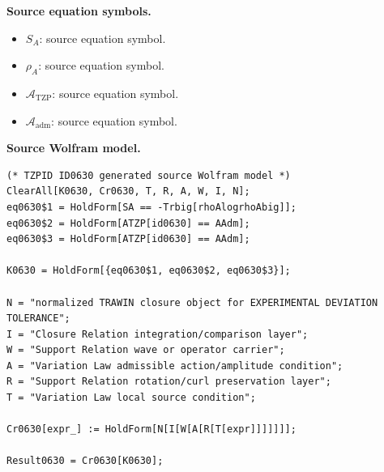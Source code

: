 \begin{minipage}[t]{0.49\linewidth}
\begingroup
\small
\raggedright
\textbf{Source equation symbols.}\par
\begin{itemize}[leftmargin=1.35em,itemsep=1pt,topsep=1pt,parsep=0pt]
    \item $S_A$: source equation symbol.
    \item $\rho_A$: source equation symbol.
    \item $\mathcal{A}_{\mathrm{TZP}}$: source equation symbol.
    \item $\mathcal{A}_{\mathrm{adm}}$: source equation symbol.
\end{itemize}
\endgroup
\end{minipage}\hfill
\begin{minipage}[t]{0.47\linewidth}
\begingroup
\scriptsize
\raggedright
\textbf{Source Wolfram model.}\par
\begin{Verbatim}[fontsize=\tiny,breaklines=true,breakanywhere=true]
(* TZPID ID0630 generated source Wolfram model *)
ClearAll[K0630, Cr0630, T, R, A, W, I, N];
eq0630$1 = HoldForm[SA == -Trbig[rhoAlogrhoAbig]];
eq0630$2 = HoldForm[ATZP[id0630] == AAdm];
eq0630$3 = HoldForm[ATZP[id0630] == AAdm];

K0630 = HoldForm[{eq0630$1, eq0630$2, eq0630$3}];

N = "normalized TRAWIN closure object for EXPERIMENTAL DEVIATION TOLERANCE";
I = "Closure Relation integration/comparison layer";
W = "Support Relation wave or operator carrier";
A = "Variation Law admissible action/amplitude condition";
R = "Support Relation rotation/curl preservation layer";
T = "Variation Law local source condition";

Cr0630[expr_] := HoldForm[N[I[W[A[R[T[expr]]]]]]];

Result0630 = Cr0630[K0630];
\end{Verbatim}
\endgroup
\end{minipage}


